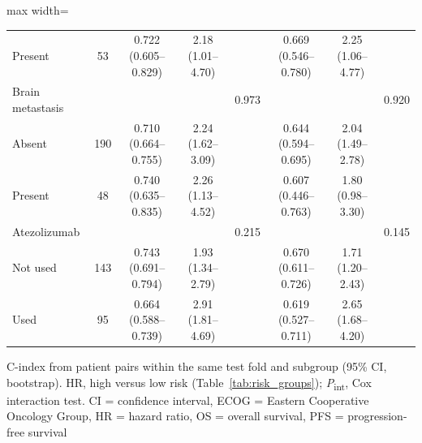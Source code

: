 \begin{table}[htbp]
\begin{adjustbox}{max width=\textwidth}
\begin{tabular}{@{}lc ccc ccc@{}}
\quad Present & 53 & 0.722 (0.605--0.829) & 2.18 (1.01--4.70) & & 0.669 (0.546--0.780) & 2.25 (1.06--4.77) & \\
Brain metastasis & & & & 0.973 & & & 0.920 \\
\quad Absent & 190 & 0.710 (0.664--0.755) & 2.24 (1.62--3.09) & & 0.644 (0.594--0.695) & 2.04 (1.49--2.78) & \\
\quad Present & 48 & 0.740 (0.635--0.835) & 2.26 (1.13--4.52) & & 0.607 (0.446--0.763) & 1.80 (0.98--3.30) & \\
Atezolizumab & & & & 0.215 & & & 0.145 \\
\quad Not used & 143 & 0.743 (0.691--0.794) & 1.93 (1.34--2.79) & & 0.670 (0.611--0.726) & 1.71 (1.20--2.43) & \\
\quad Used & 95 & 0.664 (0.588--0.739) & 2.91 (1.81--4.69) & & 0.619 (0.527--0.711) & 2.65 (1.68--4.20) & \\
\bottomrule
\end{tabular}%
\end{adjustbox}
\par\smallskip
\begin{minipage}{\textwidth}\footnotesize
C-index from patient pairs within the same test fold and subgroup (95\% CI, bootstrap). HR, high versus low risk (Table~\ref{tab:risk_groups}); \textit{P}\textsubscript{int}, Cox interaction test. CI = confidence interval, ECOG = Eastern Cooperative Oncology Group, HR = hazard ratio, OS = overall survival, PFS = progression-free survival
\end{minipage}
\end{table}

